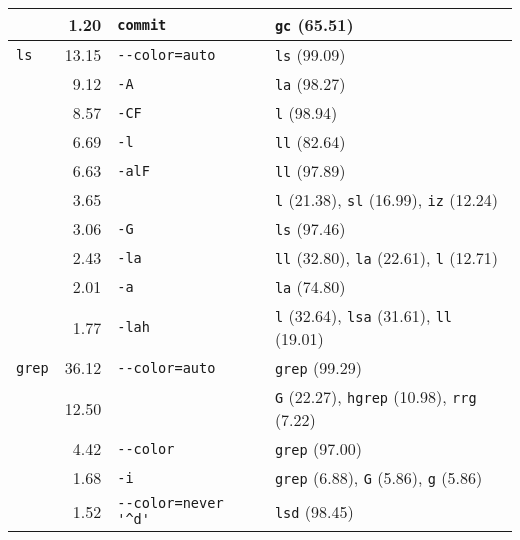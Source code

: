 \begin{table*}
\begin{tabular}{lrll}
                     &   \num{1.20} &             \verb|commit| &                                                                 \verb|gc| (\num{65.51}) \\
        \midrule
           \verb|ls| &  \num{13.15} &       \verb|--color=auto| &                                                                 \verb|ls| (\num{99.09}) \\
                     &   \num{9.12} &                 \verb|-A| &                                                                 \verb|la| (\num{98.27}) \\
                     &   \num{8.57} &                \verb|-CF| &                                                                  \verb|l| (\num{98.94}) \\
                     &   \num{6.69} &                 \verb|-l| &                                                                 \verb|ll| (\num{82.64}) \\
                     &   \num{6.63} &               \verb|-alF| &                                                                 \verb|ll| (\num{97.89}) \\
                     &   \num{3.65} &                   \verb|| &      \verb|l| (\num{21.38}), \verb|sl| (\num{16.99}), \verb|iz| (\num{12.24}) \\
                     &   \num{3.06} &                 \verb|-G| &                                                                 \verb|ls| (\num{97.46}) \\
                     &   \num{2.43} &                \verb|-la| &      \verb|ll| (\num{32.80}), \verb|la| (\num{22.61}), \verb|l| (\num{12.71}) \\
                     &   \num{2.01} &                 \verb|-a| &                                                                 \verb|la| (\num{74.80}) \\
                     &   \num{1.77} &               \verb|-lah| &     \verb|l| (\num{32.64}), \verb|lsa| (\num{31.61}), \verb|ll| (\num{19.01}) \\
        \midrule
         \verb|grep| &  \num{36.12} &       \verb|--color=auto| &                                                               \verb|grep| (\num{99.29}) \\
                     &  \num{12.50} &                   \verb|| &   \verb|G| (\num{22.27}), \verb|hgrep| (\num{10.98}), \verb|rrg| (\num{7.22}) \\
                     &   \num{4.42} &            \verb|--color| &                                                               \verb|grep| (\num{97.00}) \\
                     &   \num{1.68} &                 \verb|-i| &        \verb|grep| (\num{6.88}), \verb|G| (\num{5.86}), \verb|g| (\num{5.86}) \\
                     &   \num{1.52} & \verb|--color=never '^d'| &                                                                \verb|lsd| (\num{98.45}) \\
        \bottomrule
    \end{tabular}
\end{table*}

